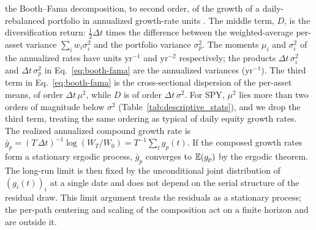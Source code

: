the Booth--Fama decomposition, to second order, of the growth of a
daily-rebalanced portfolio in annualized growth-rate units
\cite{boothFama1992, markowitz1976longRun}. The middle term, $D$, is
the diversification return: $\tfrac{1}{2}\Delta t$ times the
difference between the weighted-average per-asset variance
$\sum_i w_i \sigma_i^2$ and the portfolio variance $\sigma_p^2$. The
moments $\mu_i$ and $\sigma_i^2$ of the annualized rates
have units $\mathrm{yr}^{-1}$ and $\mathrm{yr}^{-2}$ respectively;
the products $\Delta t\,\sigma_i^2$ and $\Delta t\,\sigma_p^2$ in
Eq.~\eqref{eq:booth-fama} are the annualized variances
($\mathrm{yr}^{-1}$). The third term in Eq.~\eqref{eq:booth-fama} is
the cross-sectional dispersion of the per-asset means, of order
$\Delta t\,\mu^2$, while $D$ is of order $\Delta t\,\sigma^2$. For
SPY, $\mu^2$ lies more than two orders of magnitude below $\sigma^2$
(Table~\ref{tab:descriptive_stats}), and we drop the third term,
treating the same ordering as typical of daily equity growth rates.
The realized annualized compound growth rate is
$\bar g_p = (T\,\Delta t)^{-1}\log(W_T/W_0) = T^{-1}\sum_{t} g_p(t)$.
If the composed growth rates form a stationary ergodic process,
$\bar g_p$ converges to $\mathbb{E}(g_p)$ by the ergodic theorem. The long-run
limit is then fixed by the unconditional joint distribution of
$(g_i(t))_i$ at a single date and does not depend on the serial
structure of the residual draw. This limit argument treats the
residuals as a stationary process; the per-path centering and scaling
of the composition act on a finite horizon and are outside it.

